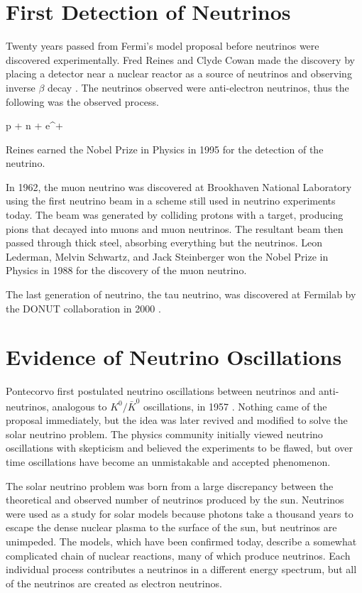 \section{First Detection of Neutrinos}
\label{sec:1stDetection}

Twenty years passed from Fermi's model proposal before neutrinos were discovered experimentally. Fred Reines and Clyde Cowan made the discovery by placing a detector near a nuclear reactor as a source of neutrinos and observing inverse $\beta$ decay \cite{ref:1953, ref:1956}. The neutrinos observed were anti-electron neutrinos, thus the following was the observed process.

\beq
p + \anue \rightarrow n + e^{+}
\label{eq:BetaInv}
\eeq

\n Reines earned the Nobel Prize in Physics in 1995 for the detection of the neutrino.

In 1962, the muon neutrino was discovered at Brookhaven National Laboratory using the first neutrino beam \cite{ref:BNL} in a scheme still used in neutrino experiments today. The beam was generated by colliding protons with a target, producing pions that decayed into muons and muon neutrinos. The resultant beam then passed through thick steel, absorbing everything but the neutrinos. Leon Lederman, Melvin Schwartz, and Jack Steinberger won the Nobel Prize in Physics in 1988 for the discovery of the muon neutrino.

The last generation of neutrino, the tau neutrino, was discovered at Fermilab by the DONUT collaboration in 2000 \cite{ref:DONUT}.

\section{Evidence of Neutrino Oscillations}
\label{sec:OscHist}

Pontecorvo first postulated neutrino oscillations between neutrinos and anti-neutrinos, analogous to $K^0/\bar{K}^0$ oscillations, in 1957 \cite{ref:Pontecorvo1}. Nothing came of the proposal immediately, but the idea was later revived and modified to solve the solar neutrino problem. The physics community initially viewed neutrino oscillations with skepticism and believed the experiments to be flawed, but over time oscillations have become an unmistakable and accepted phenomenon.

The solar neutrino problem was born from a large discrepancy between the theoretical and observed number of neutrinos produced by the sun. Neutrinos were used as a study for solar models because photons take a thousand years to escape the dense nuclear plasma to the surface of the sun, but neutrinos are unimpeded. The models, which have been confirmed today, describe a somewhat complicated chain of nuclear reactions, many of which produce neutrinos. Each individual process contributes a neutrinos in a different energy spectrum, but all of the neutrinos are created as electron neutrinos.

